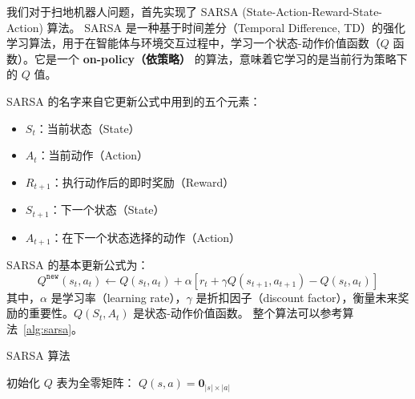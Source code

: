 我们对于扫地机器人问题，首先实现了 SARSA (State-Action-Reward-State-Action) 算法。
SARSA 是一种基于时间差分（Temporal Difference, TD）的强化学习算法，用于在智能体与环境交互过程中，学习一个状态-动作价值函数（\(Q\) 函数）。它是一个 \textbf{on-policy（依策略）} 的算法，意味着它学习的是当前行为策略下的 \(Q\) 值。

SARSA 的名字来自它更新公式中用到的五个元素：
\begin{itemize}
    \item \(S_t\)：当前状态（State）
    \item \(A_t\)：当前动作（Action）
    \item \(R_{t+1}\)：执行动作后的即时奖励（Reward）
    \item \(S_{t+1}\)：下一个状态（State）
    \item \(A_{t+1}\)：在下一个状态选择的动作（Action）
\end{itemize}

SARSA 的基本更新公式为：
\[
    Q^{\texttt{new}} \left( s_t, a_t \right) \leftarrow  Q \left( s_t, a_t \right) + \alpha \left[ r_{t} + \gamma Q \left( s_{t+1}, a_{t+1} \right) - Q \left( s_t, a_t \right) \right]
\]
其中，\(\alpha\) 是学习率（learning rate），\(\gamma\) 是折扣因子（discount factor），衡量未来奖励的重要性。\(Q \left( S_t, A_t \right)\) 是状态-动作价值函数。
整个算法可以参考算法~\ref{alg:sarsa}。

\begin{algorithm}[htbp]
\caption{SARSA 算法}\label{alg:sarsa}

初始化 \(Q\) 表为全零矩阵： \(Q(s,a) = \mathbf{0}_{\left|s\right|\times\left|a\right|}\)\;

\end{algorithm}

